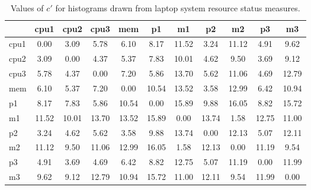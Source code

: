 \begin{table}[h!]
\begin{center}
\begin{tabular}{| l | c | c | c | c | c | c | c | c | c | c |}\hline
 & cpu1 & cpu2 & cpu3 & mem & p1 & m1 & p2 & m2 & p3 & m3 \\\hline
cpu1 & 0.00  & 3.09  & 5.78  & 6.10  & 8.17  & 11.52  & 3.24  & 11.12  & 4.91  & 9.62 \\\hline
cpu2 & 3.09  & 0.00  & 4.37  & 5.37  & 7.83  & 10.01  & 4.62  & 9.50  & 3.69  & 9.12 \\\hline
cpu3 & 5.78  & 4.37  & 0.00  & 7.20  & 5.86  & 13.70  & 5.62  & 11.06  & 4.69  & 12.79 \\\hline
mem & 6.10  & 5.37  & 7.20  & 0.00  & 10.54  & 13.52  & 3.58  & 12.99  & 6.42  & 10.94 \\\hline
p1 & 8.17  & 7.83  & 5.86  & 10.54  & 0.00  & 15.89  & 9.88  & 16.05  & 8.82  & 15.72 \\\hline
m1 & 11.52  & 10.01  & 13.70  & 13.52  & 15.89  & 0.00  & 13.74  & 1.58  & 12.75  & 11.00 \\\hline
p2 & 3.24  & 4.62  & 5.62  & 3.58  & 9.88  & 13.74  & 0.00  & 12.13  & 5.07  & 12.11 \\\hline
m2 & 11.12  & 9.50  & 11.06  & 12.99  & 16.05  & 1.58  & 12.13  & 0.00  & 11.19  & 9.54 \\\hline
p3 & 4.91  & 3.69  & 4.69  & 6.42  & 8.82  & 12.75  & 5.07  & 11.19  & 0.00  & 11.99 \\\hline
m3 & 9.62  & 9.12  & 12.79  & 10.94  & 15.72  & 11.00  & 12.11  & 9.54  & 11.99  & 0.00 \\\hline
\end{tabular}
\caption{Values of $c'$ for histograms drawn from laptop system resource status measures.}
\end{center}
\end{table}